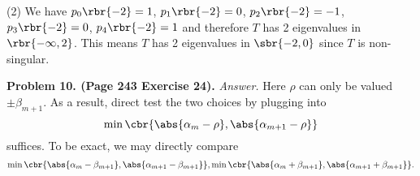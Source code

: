 \documentclass[english, nochinese]{pnote}
\begin{document}
(2) We have $ p_0 \rbr{-2} = 1 $, $ p_1 \rbr{-2} = 0 $, $ p_2 \rbr{-2} = -1 $, $ p_3 \rbr{-2} = 0 $, $ p_4 \rbr{-2} = 1 $ and therefore $T$ has 2 eigenvalues in $ \rbr{ -\infty, 2 } $. This means $T$ has 2 eigenvalues in $ \sbr{ -2, 0 } $ since $T$ is non-singular.

\textbf{Problem 10. (Page 243 Exercise 24).} \textit{Answer.} Here $\rho$ can only be valued $ \pm \beta_{ m + 1 } $. As a result, direct test the two choices by plugging into
\begin{equation}
\min \cbr{ \abs{ \alpha_m - \rho }, \abs{ \alpha_{ m + 1 } - \rho } }
\end{equation}
suffices. To be exact, we may directly compare
\begin{equation}
\min \cbr{ \abs{ \alpha_m - \beta_{ m + 1 } }, \abs{ \alpha_{ m + 1 } - \beta_{ m + 1 } } }, \min \cbr{ \abs{ \alpha_m + \beta_{ m + 1 } }, \abs{ \alpha_{ m + 1 } + \beta_{ m + 1 } } }.
\end{equation}
\end{document}

